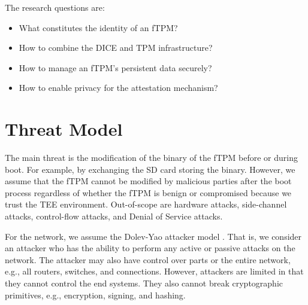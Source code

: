 
The research questions are:
\begin{itemize}
  \item What constitutes the identity of an fTPM? %
  \item How to combine the DICE and TPM infrastructure? %
  \item How to manage an fTPM's persistent data securely? %
  \item How to enable privacy for the attestation mechanism?
\end{itemize}



\section{Threat Model}


The main threat is the modification of the binary of the fTPM before or during boot. For example, by exchanging the SD card storing the binary.
However, we assume that the fTPM cannot be modified by malicious parties after the boot process regardless of whether the fTPM is benign or compromised because we trust the TEE environment.
Out-of-scope are hardware attacks, side-channel attacks, control-flow attacks, and Denial of Service attacks.

For the network, we assume the Dolev-Yao attacker model \cite{Dolev1983}. That is, we consider an attacker who has the ability to perform any active or passive attacks on the network. The attacker may also have control over parts or the entire network, e.g., all routers, switches, and connections. However, attackers are limited in that they cannot control the end systems. They also cannot break cryptographic primitives, e.g., encryption, signing, and hashing.

